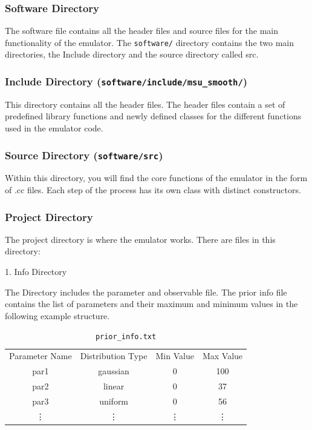 \documentclass[12pt]{article}
\numberwithin{equation}{section}
\numberwithin{figure}{section}
\begin{document}
\subsubsection{Software Directory}

The software file contains all the header files and source files for the main functionality of the emulator. The {\tt software/} directory contains the two main directories, the Include directory and the source directory called src.

\subsubsection{Include Directory ({\tt software/include/msu_smooth/})}

This directory contains all the header files. The header files contain a set of predefined library functions and newly defined classes for the different functions used in the emulator code. 

\subsubsection{Source Directory ({\tt software/src})}

Within this directory, you will find the core functions of the emulator in the form of .cc files. Each step of the process has its own class with distinct constructors.  

\newpage

\subsubsection{Project Directory}
The project directory is where the emulator works. There are files in this directory: 

1. Info Directory 

The Directory includes the parameter and observable file. 
The prior info file contains the list of parameters and their maximum and minimum values in the following example structure. 

\begin{table}[!h]
    \centering
    \begin{tabular}{c|c|c|c}
         Parameter Name & Distribution Type & Min Value & Max Value \\
         par1 & gaussian & 0 & 100\\
         par2 & linear & 0 & 37 \\
         par3 & uniform & 0 &  56 \\
          \vdots & \vdots & \vdots & \vdots
    \end{tabular}
    \caption{{\tt{prior\_info.txt}}}
    \label{tab:my_label}
\end{table}
\end{document}
